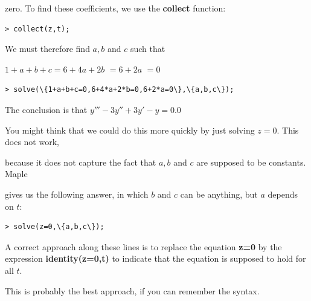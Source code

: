 \documentclass{article}
\begin{document}
\begin{Maple Normal}
zero.  To find these coefficients, we use the \textcolor[RGB]{255,0,0}{\textbf{collect}} function:
\end{Maple Normal}
\begin{lstlisting}
> collect(z,t);
\end{lstlisting}
\begin{Maple Normal}
We must therefore find 
$a ,b$ and 
$c$ such that 
\end{Maple Normal}
\begin{center}

$1+a +b +c =6+4 a +2 b$
$=6+2 a$
$=0$\end{center}
\begin{Maple Normal}

\end{Maple Normal}
\begin{lstlisting}
> solve(\{1+a+b+c=0,6+4*a+2*b=0,6+2*a=0\},\{a,b,c\});
\end{lstlisting}
\begin{Maple Normal}
The conclusion is that 
$\mathit{y'''} -3 \mathit{y''} +3 \mathit{y'} -y = 0.0$
\end{Maple Normal}
\begin{Maple Normal}

\end{Maple Normal}
\begin{Maple Normal}
You might think that we could do this more quickly by just solving 
$z =0$.  This does not work,
\end{Maple Normal}
\begin{Maple Normal}
because it does not capture the fact that 
$a ,b$ and 
$c$ are supposed to be constants.  Maple
\end{Maple Normal}
\begin{Maple Normal}
gives us the following answer, in which 
$b$ and 
$c$ can be anything, but 
$a$ depends on 
$t$:
\end{Maple Normal}
\begin{lstlisting}
> solve(z=0,\{a,b,c\});
\end{lstlisting}
\begin{Maple Normal}
A correct approach along these lines is to replace the equation \textcolor[RGB]{255,0,0}{\textbf{z=0}} by the expression \textcolor[RGB]{255,0,0}{\textbf{identity(z=0,t)}} to indicate that the equation is supposed to hold for all 
$t$. 
\end{Maple Normal}
\begin{Maple Normal}
This is probably the best approach, if you can remember the syntax.
\end{Maple Normal}
\end{document}
